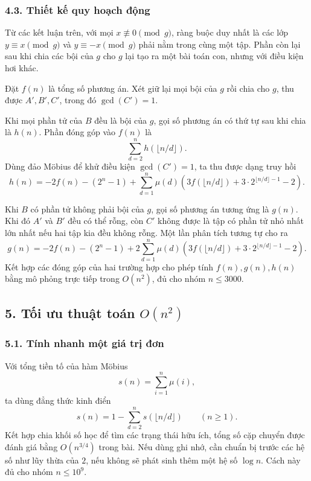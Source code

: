 \documentclass[11pt]{article}
\begin{document}
\subsubsection*{4.3. Thiết kế quy hoạch động}

Từ các kết luận trên, với mọi \(x\not\equiv 0\pmod g\), ràng buộc duy nhất là
các lớp \(y\equiv x\pmod g\) và \(y\equiv -x\pmod g\) phải nằm trong cùng một
tập. Phần còn lại sau khi chia các bội của \(g\) cho \(g\) lại tạo ra một bài
toán con, nhưng với điều kiện hơi khác.

Đặt \(f(n)\) là tổng số phương án. Xét giữ lại mọi bội của \(g\) rồi chia cho
\(g\), thu được \(A',B',C'\), trong đó \(\gcd(C')=1\).

Khi mọi phần tử của \(B\) đều là bội của \(g\), gọi số phương án có thứ tự sau
khi chia là \(h(n)\). Phần đóng góp vào \(f(n)\) là
\[
  \sum_{d=2}^{n} h(\lfloor n/d\rfloor).
\]
Dùng đảo Möbius để khử điều kiện \(\gcd(C')=1\), ta thu được dạng truy hồi
\[
  h(n)=
  -2f(n)-(2^n-1)
  +\sum_{d=1}^{n}\mu(d)
  \left(3f(\lfloor n/d\rfloor)+3\cdot 2^{\lfloor n/d\rfloor-1}-2\right).
\]

Khi \(B\) có phần tử không phải bội của \(g\), gọi số phương án tương ứng là
\(g(n)\). Khi đó \(A'\) và \(B'\) đều có thể rỗng, còn \(C'\) không được là tập
có phần tử nhỏ nhất lớn nhất nếu hai tập kia đều không rỗng. Một lần phân tích
tương tự cho ra
\[
  g(n)=
  -2f(n)-(2^n-1)
  +2\sum_{d=1}^{n}\mu(d)
  \left(3f(\lfloor n/d\rfloor)+3\cdot 2^{\lfloor n/d\rfloor-1}-2\right).
\]
Kết hợp các đóng góp của hai trường hợp cho phép tính \(f(n),g(n),h(n)\) bằng
mô phỏng trực tiếp trong \(O(n^2)\), đủ cho nhóm \(n\le 3000\).

\subsection*{5. Tối ưu thuật toán \(O(n^2)\)}

\subsubsection*{5.1. Tính nhanh một giá trị đơn}

Với tổng tiền tố của hàm Möbius
\[
  s(n)=\sum_{i=1}^{n}\mu(i),
\]
ta dùng đẳng thức kinh điển
\[
  s(n)=1-\sum_{d=2}^{n}s(\lfloor n/d\rfloor)\qquad(n\ge 1).
\]
Kết hợp chia khối số học để tìm các trạng thái hữu ích, tổng số cặp chuyển
được đánh giá bằng \(O(n^{3/4})\) trong bài. Nếu dùng ghi nhớ, cần chuẩn bị
trước các hệ số như lũy thừa của \(2\), nếu không sẽ phát sinh thêm một hệ số
\(\log n\). Cách này đủ cho nhóm \(n\le 10^9\).
\end{document}
